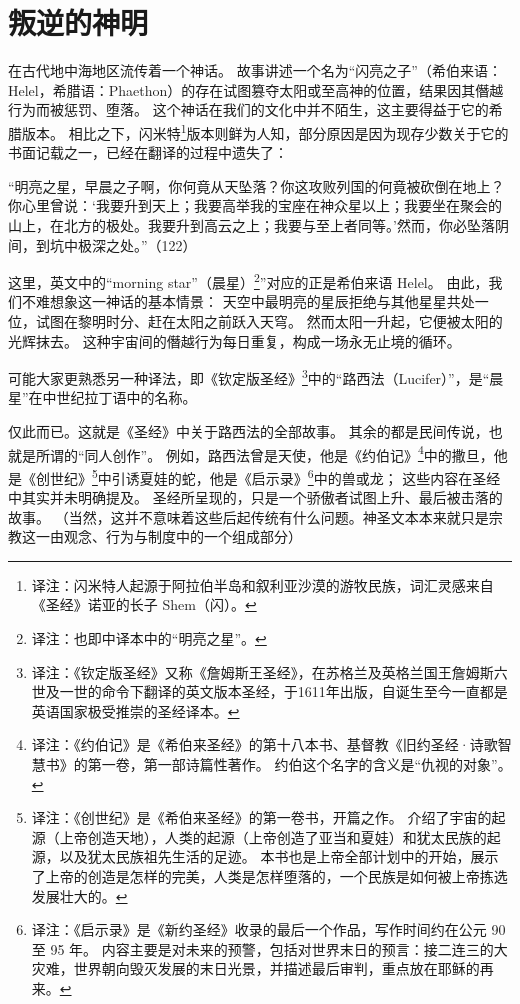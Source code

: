\chapter{叛逆的神明}
在古代地中海地区流传着一个神话。
故事讲述一个名为“闪亮之子”（希伯来语：Helel，希腊语：Phaethon）的存在试图篡夺太阳或至高神的位置，结果因其僭越行为而被惩罚、堕落。
这个神话在我们的文化中并不陌生，这主要得益于它的希腊版本。
相比之下，闪米特\footnote{%
    译注：闪米特人起源于阿拉伯半岛和叙利亚沙漠的游牧民族，词汇灵感来自《圣经》诺亚的长子 Shem（闪）。
}版本则鲜为人知，部分原因是因为现存少数关于它的书面记载之一，已经在翻译的过程中遗失了：

“明亮之星，早晨之子啊，你何竟从天坠落？你这攻败列国的何竟被砍倒在地上？你心里曾说：‘我要升到天上；我要高举我的宝座在神众星以上；我要坐在聚会的山上，在北方的极处。我要升到高云之上；我要与至上者同等。’然而，你必坠落阴间，到坑中极深之处。”（122）

这里，英文中的“morning star”（晨星）\footnote{%
    译注：也即中译本中的“明亮之星”。
}”对应的正是希伯来语 Helel。
由此，我们不难想象这一神话的基本情景：
天空中最明亮的星辰拒绝与其他星星共处一位，试图在黎明时分、赶在太阳之前跃入天穹。
然而太阳一升起，它便被太阳的光辉抹去。
这种宇宙间的僭越行为每日重复，构成一场永无止境的循环。

可能大家更熟悉另一种译法，即《钦定版圣经》\footnote{%
    译注：《钦定版圣经》又称《詹姆斯王圣经》，在苏格兰及英格兰国王詹姆斯六世及一世的命令下翻译的英文版本圣经，于1611年出版，自诞生至今一直都是英语国家极受推崇的圣经译本。
}中的“路西法（Lucifer）”，是“晨星”在中世纪拉丁语中的名称。

仅此而已。这就是《圣经》中关于路西法的全部故事。
其余的都是民间传说，也就是所谓的“同人创作”。
例如，路西法曾是天使，他是《约伯记》\footnote{%
    译注：《约伯记》是《希伯来圣经》的第十八本书、基督教《旧约圣经·诗歌智慧书》的第一卷，第一部诗篇性著作。
    约伯这个名字的含义是“仇视的对象”。
}中的撒旦，他是《创世纪》\footnote{%
    译注：《创世纪》是《希伯来圣经》的第一卷书，开篇之作。
    介绍了宇宙的起源（上帝创造天地），人类的起源（上帝创造了亚当和夏娃）和犹太民族的起源，以及犹太民族祖先生活的足迹。
    本书也是上帝全部计划中的开始，展示了上帝的创造是怎样的完美，人类是怎样堕落的，一个民族是如何被上帝拣选发展壮大的。
}中引诱夏娃的蛇，他是《启示录》\footnote{%
    译注：《启示录》是《新约圣经》收录的最后一个作品，写作时间约在公元 90 至 95 年。
    内容主要是对未来的预警，包括对世界末日的预言：接二连三的大灾难，世界朝向毁灭发展的末日光景，并描述最后审判，重点放在耶稣的再来。
}中的兽或龙；
这些内容在圣经中其实并未明确提及。
圣经所呈现的，只是一个骄傲者试图上升、最后被击落的故事。
（当然，这并不意味着这些后起传统有什么问题。神圣文本本来就只是宗教这一由观念、行为与制度中的一个组成部分）

